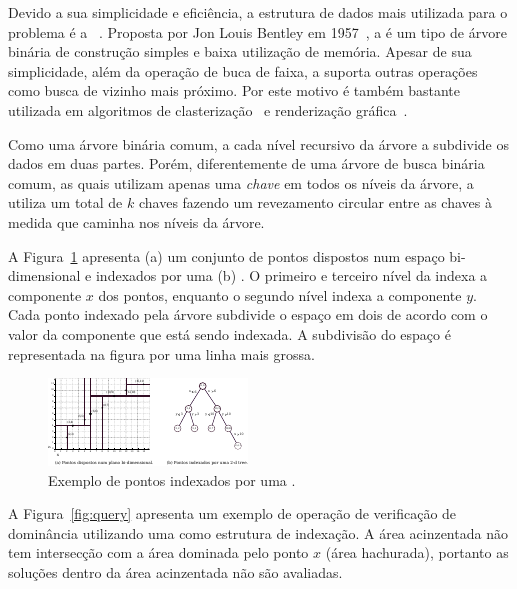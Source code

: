 Devido a sua simplicidade e eficiência, a estrutura de dados mais utilizada
para o problema é a \emph{\kdtree}~\cite{preparata2012computational}.
Proposta por Jon Louis Bentley em 1957~\cite{bentley1975}, a \kdtree{} é um tipo de
árvore binária de construção simples e baixa utilização de memória.
Apesar de sua simplicidade, além da operação de buca de faixa, a \kdtree{}
suporta outras operações como busca de vizinho mais próximo.
Por este motivo é também bastante utilizada em algoritmos de
clasterização~\cite{kanungo2002efficient, indyk1998approximate}
e renderização gráfica~\cite{owens2007survey}.

Como uma árvore binária comum, a cada nível recursivo da árvore
a \kdtree{} subdivide os dados em duas partes.
Porém, diferentemente de uma árvore de busca binária comum, as quais utilizam
apenas uma \emph{chave} em todos os níveis da árvore, a \kdtree{} utiliza um
total de $k$ chaves fazendo um revezamento circular entre as chaves à medida
que caminha nos níveis da árvore.

A Figura~\ref{fig:kdom-kd} apresenta (a) um conjunto de pontos dispostos num
espaço bi-dimensional e indexados por uma (b) .
O primeiro e terceiro nível da  indexa a componente $x$ dos pontos,
enquanto o segundo nível indexa a componente $y$.
Cada ponto indexado pela árvore subdivide o espaço em dois de acordo
com o valor da componente que está sendo indexada.
A subdivisão do espaço é representada na figura por uma linha mais grossa.

\begin{figure}[H]
  \centering
  \includegraphics[scale=4.8]{img/kdt/dom-kd}
  \caption{Exemplo de pontos indexados por uma \kdtree{}.}
  \label{fig:kdom-kd}
\end{figure}

A Figura~\ref{fig:query} apresenta um exemplo de operação de verificação de
dominância utilizando uma  como estrutura de indexação.
A área acinzentada não tem intersecção com a área dominada pelo ponto $x$
(área hachurada), portanto as soluções dentro da área acinzentada não são
avaliadas.


